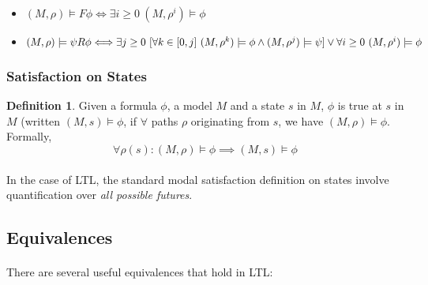 \documentclass{article}
\theoremstyle{plain}
\theoremstyle{definition}
\newtheorem{defn}[thm]{Definition} %
\begin{document}
\begin{multicols}{2}
\begin{itemize}
\item $(M, \rho) \models F\phi \Longleftrightarrow \exists i \geq 0\ (M, \rho^i) \models \phi$
\item $(M, \rho) \models \psi R\phi \Longleftrightarrow\\ \exists j \geq 0\ \lbrack \forall k \in [0, j]\ (M, \rho^k) \models \phi \land (M, \rho^j) \models \psi\rbrack\\ \lor \forall i \geq 0\ (M, \rho^i) \models \phi$
\end{itemize}

\subsubsection{Satisfaction on States}
\begin{defn}
Given a formula $\phi$, a model $M$ and a state $s$ in $M$, $\phi$ is true at $s$ in $M$ (written $(M, s) \models \phi$, if $\forall$ paths $\rho$ originating from $s$, we have $(M, \rho) \models \phi$. Formally, $$\forall \rho(s): (M, \rho) \models \phi \implies (M, s) \models \phi$$
\end{defn}

\paragraph{} In the case of LTL, the standard modal satisfaction definition on states involve quantification over \textit{all possible futures}.

\subsection{Equivalences}

\paragraph{} There are several useful equivalences that hold in LTL:


\end{multicols}
\end{document}
